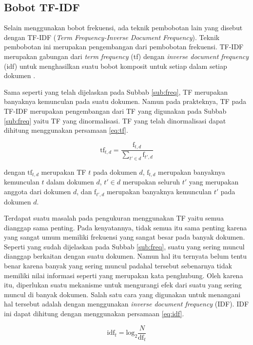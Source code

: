 \subsection{Bobot TF-IDF}
\label{sub:tf-idf}
Selain menggunakan bobot frekuensi, ada teknik pembobotan lain yang disebut dengan TF-IDF (\textit{Term Frequency-Inverse Document Frequency}). Teknik pembobotan ini merupakan pengembangan dari pembobotan frekuensi. TF-IDF merupakan gabungan dari \textit{term frequency} (tf) dengan \textit{inverse document frequency} (idf) untuk menghasilkan suatu bobot komposit untuk setiap \term dalam setiap dokumen \cite{schutze2008introduction}.

Sama seperti yang telah dijelaskan pada Subbab \ref{sub:freq}, TF merupakan banyaknya kemunculan \term pada suatu dokumen. Namun pada prakteknya, TF pada TF-IDF merupakan pengembangan dari TF yang digunakan pada Subbab \ref{sub:freq} yaitu TF yang dinormalisasi. TF yang telah dinormalisasi dapat dihitung menggunakan persamaan \ref{eq:tf}.

\begin{equation}
	\label{eq:tf}
	\textrm{tf}_{t,d}=\frac{\textrm{f}_{t,d}}{\sum_{t' \in d}\textrm{f}_{t',d}}
\end{equation}

dengan $\textrm{tf}_{t,d}$ merupakan TF \term $t$ pada dokumen $d$, $\textrm{f}_{t,d}$ merupakan banyaknya kemunculan \term $t$ dalam dokumen $d$, $t' \in d$ merupakan seluruh \term $t'$ yang merupakan anggota dari dokumen $d$, dan $\textrm{f}_{t',d}$ merupakan banyaknya kemunculan \term $t'$ pada dokumen $d$.

Terdapat suatu masalah pada pengukuran menggunakan TF yaitu semua \term dianggap sama penting. Pada kenyatannya, tidak semua \term itu sama penting karena \term yang sangat umum memiliki frekuensi yang sangat besar pada banyak dokumen. Seperti yang sudah dijelaskan pada Subbab \ref{sub:freq}, suatu \term yang sering muncul dianggap berkaitan dengan suatu dokumen. Namun hal itu ternyata belum tentu benar karena banyak \term yang sering muncul padahal \term tersebut sebenarnya tidak memiliki nilai informasi seperti \term yang merupakan kata penghubung. Oleh karena itu, diperlukan suatu mekanisme untuk mengurangi efek dari suatu \term yang sering muncul di banyak dokumen. Salah satu cara yang digunakan untuk menangani hal tersebut adalah dengan menggunakan \textit{inverse document frequency} (IDF). IDF ini dapat dihitung dengan menggunakan persamaan \ref{eq:idf}.

\begin{equation}
	\label{eq:idf}
	\textrm{idf}_t = \textrm{log}_2 \frac{N}{\textrm{df}_t}
\end{equation}

